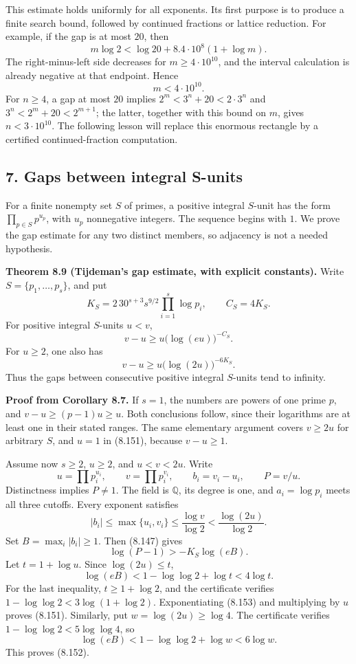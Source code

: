 \documentclass[
  11pt,
  a4paper,
]{article}
\begin{document}
This estimate holds uniformly for all exponents. Its first purpose is to
produce a finite search bound, followed by continued fractions or
lattice reduction. For example, if the gap is at most \(20\), then \[
m\log2<\log20+8.4\cdot10^8(1+\log m). \tag{8.150}
\] The right-minus-left side decreases for \(m\ge4\cdot10^{10}\), and
the interval calculation is already negative at that endpoint. Hence \[
m<4\cdot10^{10}.
\] For \(n\ge4\), a gap at most \(20\) implies \(2^m<3^n+20<2\cdot3^n\)
and \(3^n<2^m+20<2^{m+1}\); the latter, together with this bound on
\(m\), gives \(n<3\cdot10^{10}\). The following lesson will replace this
enormous rectangle by a certified continued-fraction computation.

\subsection{7. Gaps between integral
S-units}\label{gaps-between-integral-s-units}

For a finite nonempty set \(S\) of primes, a positive integral
\(S\)-unit has the form \(\prod_{p\in S}p^{u_p}\), with \(u_p\)
nonnegative integers. The sequence begins with \(1\). We prove the gap
estimate for any two distinct members, so adjacency is not a needed
hypothesis.

\textbf{Theorem 8.9 (Tijdeman's gap estimate, with explicit constants).}
Write \(S=\{p_1,\ldots,p_s\}\), and put \[
K_S=2\,30^{s+3}s^{9/2}\prod_{i=1}^s\log p_i,\qquad
C_S=4K_S.
\] For positive integral \(S\)-units \(u<v\), \[
v-u\ge u\bigl(\log(eu)\bigr)^{-C_S}. \tag{8.151}
\] For \(u\ge2\), one also has \[
v-u\ge u\bigl(\log(2u)\bigr)^{-6K_S}. \tag{8.152}
\] Thus the gaps between consecutive positive integral \(S\)-units tend
to infinity.

\textbf{Proof from Corollary 8.7.} If \(s=1\), the numbers are powers of
one prime \(p\), and \(v-u\ge(p-1)u\ge u\). Both conclusions follow,
since their logarithms are at least one in their stated ranges. The same
elementary argument covers \(v\ge2u\) for arbitrary \(S\), and \(u=1\)
in (8.151), because \(v-u\ge1\).

Assume now \(s\ge2\), \(u\ge2\), and \(u<v<2u\). Write \[
u=\prod p_i^{u_i},\qquad v=\prod p_i^{v_i},\qquad
b_i=v_i-u_i,\qquad P=v/u.
\] Distinctness implies \(P\ne1\). The field is \(\mathbb Q\), its
degree is one, and \(a_i=\log p_i\) meets all three cutoffs. Every
exponent satisfies \[
|b_i|\le\max\{u_i,v_i\}
\le\frac{\log v}{\log2}<\frac{\log(2u)}{\log2}.
\] Set \(B=\max_i|b_i|\ge1\). Then (8.147) gives \[
\log(P-1)>-K_S\log(eB). \tag{8.153}
\] Let \(t=1+\log u\). Since \(\log(2u)\le t\), \[
\log(eB)<1-\log\log2+\log t
<4\log t.
\] For the last inequality, \(t\ge1+\log2\), and the certificate
verifies \(1-\log\log2<3\log(1+\log2)\). Exponentiating (8.153) and
multiplying by \(u\) proves (8.151). Similarly, put
\(w=\log(2u)\ge\log4\). The certificate verifies
\(1-\log\log2<5\log\log4\), so \[
\log(eB)<1-\log\log2+\log w<6\log w.
\] This proves (8.152).
\end{document}
